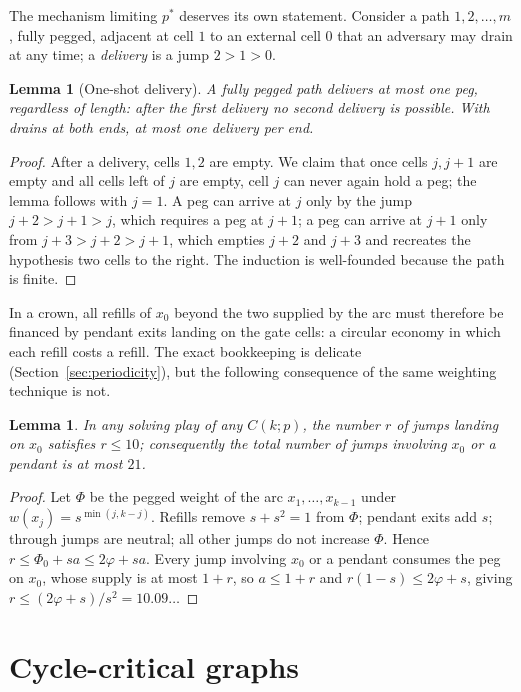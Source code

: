\documentclass[11pt]{article}
\newtheorem{lemma}[theorem]{Lemma}
\theoremstyle{definition}
\begin{document}
The mechanism limiting $p^*$ deserves its own statement. Consider a
path $1,2,\dots,m$, fully pegged, adjacent at cell $1$ to an external
cell $0$ that an adversary may drain at any time; a \emph{delivery}
is a jump $2\!>\!1\!>\!0$.

\begin{lemma}[One-shot delivery]\label{lem:oneshot}
A fully pegged path delivers at most one peg, regardless of length:
after the first delivery no second delivery is possible. With drains
at both ends, at most one delivery per end.
\end{lemma}

\begin{proof}
After a delivery, cells $1,2$ are empty. We claim that once cells
$j,j+1$ are empty and all cells left of $j$ are empty, cell $j$ can
never again hold a peg; the lemma follows with $j=1$. A peg can
arrive at $j$ only by the jump $j{+}2\!>\!j{+}1\!>\!j$, which
requires a peg at $j+1$; a peg can arrive at $j+1$ only from
$j{+}3\!>\!j{+}2\!>\!j{+}1$, which empties $j+2$ and $j+3$ and
recreates the hypothesis two cells to the right. The induction is
well-founded because the path is finite.
\end{proof}

In a crown, all refills of $x_0$ beyond the two supplied by the arc
must therefore be financed by pendant exits landing on the gate
cells: a circular economy in which each refill costs a refill. The
exact bookkeeping is delicate (Section~\ref{sec:periodicity}), but
the following consequence of the same weighting technique is not.

\begin{lemma}\label{lem:refills}
In any solving play of any $C(k;p)$, the number $r$ of jumps landing
on $x_0$ satisfies $r\le 10$; consequently the total number of jumps
involving $x_0$ or a pendant is at most $21$.
\end{lemma}

\begin{proof}
Let $\Phi$ be the pegged weight of the arc $x_1,\dots,x_{k-1}$ under
$w(x_j)=s^{\min(j,k-j)}$. Refills remove $s+s^2=1$ from $\Phi$;
pendant exits add $s$; through jumps are neutral; all other jumps do
not increase $\Phi$. Hence $r\le\Phi_0+sa\le2\varphi+sa$. Every
jump involving $x_0$ or a pendant consumes the peg on $x_0$, whose
supply is at most $1+r$, so $a\le1+r$ and
$r(1-s)\le2\varphi+s$, giving $r\le(2\varphi+s)/s^2=10.09\ldots$
\end{proof}

\section{Cycle-critical graphs}\label{sec:critical}
\end{document}

